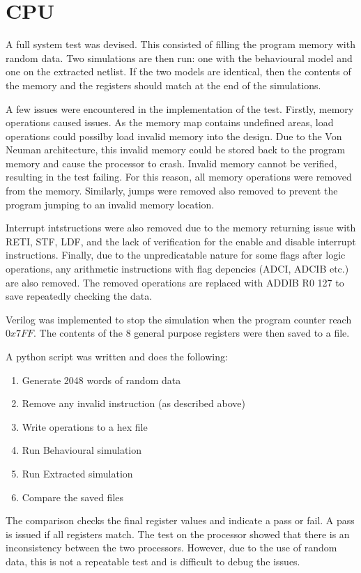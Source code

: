 
\section{CPU}

A full system test was devised. 
This consisted of filling the program memory with random data. 
Two simulations are then run: one with the behavioural model and one on the extracted netlist. 
If the two models are identical, then the contents of the memory and the registers should match at the end of the simulations.

A few issues were encountered in the implementation of the test.
Firstly, memory operations caused issues. 
As the memory map contains undefined areas, load operations could possilby load invalid memory into the design.
Due to the Von Neuman architecture, this invalid memory could be stored back to the program memory and cause the processor to crash. 
Invalid memory cannot be verified, resulting in the test failing. 
For this reason, all memory operations were removed from the memory.
Similarly, jumps were removed also removed to prevent the program jumping to an invalid memory location. 

Interrupt intstructions were also removed due to the memory returning issue with RETI, STF, LDF, and the lack of verification for the enable and disable interrupt instructions. 
Finally, due to the unpredicatable nature for some flags after logic operations, any arithmetic instructions with flag depencies (ADCI, ADCIB etc.) are also removed. 
The removed operations are replaced with ADDIB R0 127 to save repeatedly checking the data. 

Verilog was implemented to stop the simulation when the program counter reach $0x7FF$. 
The contents of the 8 general purpose registers were then saved to a file. 


A python script was written and does the following:
\begin{enumerate}
\item Generate 2048 words of random data
\item Remove any invalid instruction (as described above)
\item Write operations to a hex file
\item Run Behavioural simulation
\item Run Extracted simulation
\item Compare the saved files
\end{enumerate}

The comparison checks the final register values and indicate a pass or fail. 
A pass is issued if all registers match. 
The test on the processor showed that there is an inconsistency between the two processors.
However, due to the use of random data, this is not a repeatable test and is difficult to debug the issues. 


